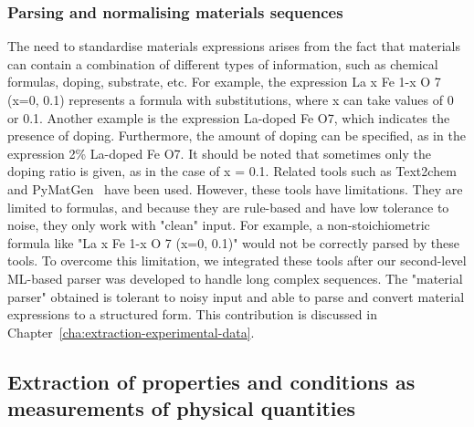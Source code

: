 \subsubsection{Parsing and normalising materials sequences}
\label{sec:intro-material-parser}

The need to standardise materials expressions arises from the fact that materials can contain a combination of different types of information, such as chemical formulas, doping, substrate, etc. For example, the expression La x Fe 1-x O 7 (x=0, 0.1) represents a formula with substitutions, where x can take values of 0 or 0.1. Another example is the expression La-doped Fe O7, which indicates the presence of doping. Furthermore, the amount of doping can be specified, as in the expression 2\% La-doped Fe O7. It should be noted that sometimes only the doping ratio is given, as in the case of x = 0.1. 
Related tools such as Text2chem~\cite{kononova2019text} and PyMatGen~\cite{Ong2013} have been used. 
However, these tools have limitations. They are limited to formulas, and because they are rule-based and have low tolerance to noise, they only work with "clean" input. 
For example, a non-stoichiometric formula like "La x Fe 1-x O 7 (x=0, 0.1)" would not be correctly parsed by these tools. 
To overcome this limitation, we integrated these tools after our second-level ML-based parser was developed to handle long complex sequences.
The "material parser" obtained is tolerant to noisy input and able to parse and convert material expressions to a structured form. 
This contribution is discussed in Chapter~\ref{cha:extraction-experimental-data}.


\subsection{Extraction of properties and conditions as measurements of physical quantities}
\label{sec:intro-ner-quantities}

